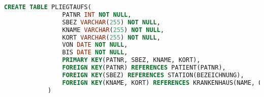 \documentclass[a4paper,12pt]{article}
\begin{document}
\begin{enumerate}[(a)]
\begin{lstlisting}[language=SQL]
            CREATE TABLE PLIEGTAUFS(
                PATNR INT NOT NULL,
                SBEZ VARCHAR(255) NOT NULL,
                KNAME VARCHAR(255) NOT NULL,
                KORT VARCHAR(255) NOT NULL,
                VON DATE NOT NULL,
                BIS DATE NOT NULL,
                PRIMARY KEY(PATNR, SBEZ, KNAME, KORT),
                FOREIGN KEY(PATNR) REFERENCES PATIENT(PATNR),
                FOREIGN KEY(SBEZ) REFERENCES STATION(BEZEICHNUNG),
                FOREIGN KEY(KNAME, KORT) REFERENCES KRANKENHAUS(NAME, ORT)
            )

        \end{lstlisting}
    \end{enumerate}

\end{document}
